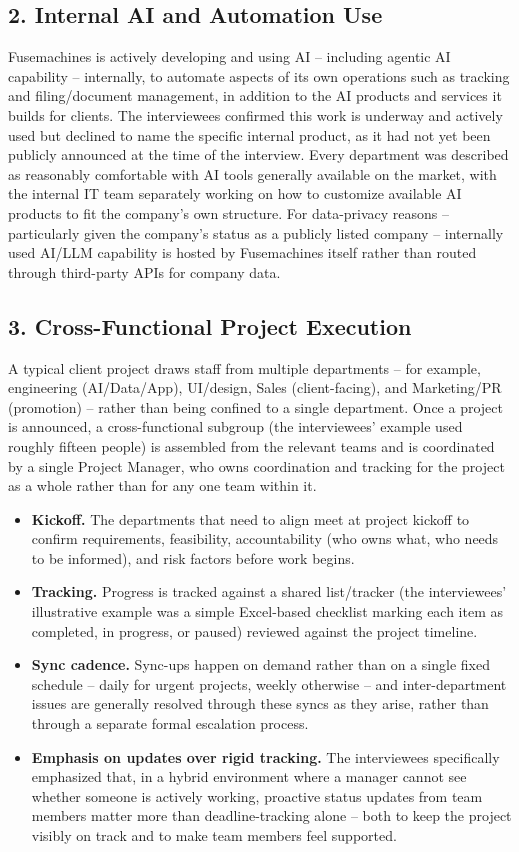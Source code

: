 \documentclass[12pt,a4paper]{report}
\begin{document}
\subsection*{2. Internal AI and Automation Use}
Fusemachines is actively developing and using AI -- including agentic AI capability -- internally, to automate aspects of its own operations such as tracking and filing/document management, in addition to the AI products and services it builds for clients. The interviewees confirmed this work is underway and actively used but declined to name the specific internal product, as it had not yet been publicly announced at the time of the interview. Every department was described as reasonably comfortable with AI tools generally available on the market, with the internal IT team separately working on how to customize available AI products to fit the company's own structure. For data-privacy reasons -- particularly given the company's status as a publicly listed company -- internally used AI/LLM capability is hosted by Fusemachines itself rather than routed through third-party APIs for company data.

\subsection*{3. Cross-Functional Project Execution}
A typical client project draws staff from multiple departments -- for example, engineering (AI/Data/App), UI/design, Sales (client-facing), and Marketing/PR (promotion) -- rather than being confined to a single department. Once a project is announced, a cross-functional subgroup (the interviewees' example used roughly fifteen people) is assembled from the relevant teams and is coordinated by a single Project Manager, who owns coordination and tracking for the project as a whole rather than for any one team within it.

\begin{itemize}[leftmargin=1.5cm]
  \item \textbf{Kickoff.} The departments that need to align meet at project kickoff to confirm requirements, feasibility, accountability (who owns what, who needs to be informed), and risk factors before work begins.
  \item \textbf{Tracking.} Progress is tracked against a shared list/tracker (the interviewees' illustrative example was a simple Excel-based checklist marking each item as completed, in progress, or paused) reviewed against the project timeline.
  \item \textbf{Sync cadence.} Sync-ups happen on demand rather than on a single fixed schedule -- daily for urgent projects, weekly otherwise -- and inter-department issues are generally resolved through these syncs as they arise, rather than through a separate formal escalation process.
  \item \textbf{Emphasis on updates over rigid tracking.} The interviewees specifically emphasized that, in a hybrid environment where a manager cannot see whether someone is actively working, proactive status updates from team members matter more than deadline-tracking alone -- both to keep the project visibly on track and to make team members feel supported.
\end{itemize}
\end{document}
